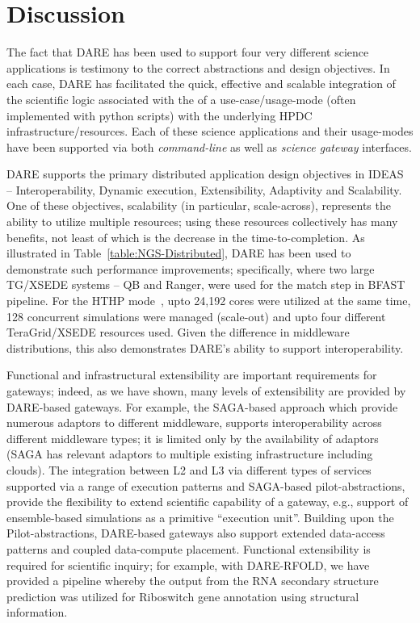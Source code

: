 \documentclass[]{svjour3}
\begin{document}
\section{Discussion}

The fact that DARE has been used to support four very different
science applications is testimony to the correct abstractions and
design objectives. In each case, DARE has facilitated the quick,
effective and scalable integration of the scientific logic associated
with the of a use-case/usage-mode (often implemented with python
scripts) with the underlying HPDC infrastructure/resources. Each of
these science applications and their usage-modes have been supported
via both {\it command-line} as well as {\it science gateway}
interfaces.

DARE supports the primary distributed application design objectives in
IDEAS~\cite{ideas} -- Interoperability, Dynamic execution,
Extensibility, Adaptivity and Scalability. One of these objectives,
scalability (in particular, scale-across), represents the ability to
utilize multiple resources; using these resources collectively has
many benefits, not least of which is the decrease in the
time-to-completion. As illustrated in
Table~\ref{table:NGS-Distributed}, DARE has been used to demonstrate
such performance improvements; specifically, where two large TG/XSEDE
systems -- QB and Ranger, were used for the match step in BFAST
pipeline. For the HTHP mode~\cite{bigjob-ccgrid12}, upto 24,192 cores
were utilized at the same time, 128 concurrent simulations were
managed (scale-out) and upto four different TeraGrid/XSEDE resources
used. Given the difference in middleware distributions, this also
demonstrates DARE's ability to support interoperability.

Functional and infrastructural extensibility are important
requirements for gateways; indeed, as we have shown, many levels of
extensibility are provided by DARE-based gateways. For example, the
SAGA-based approach which provide numerous adaptors to different
middleware, supports interoperability across different middleware
types; it is limited only by the availability of adaptors (SAGA has
relevant adaptors to multiple existing infrastructure including
clouds). The integration between L2 and L3 via different types of
services supported via a range of execution patterns and SAGA-based
pilot-abstractions, provide the flexibility to extend scientific
capability of a gateway, e.g., support of ensemble-based simulations
as a primitive ``execution unit''. Building upon the
Pilot-abstractions, DARE-based gateways also support extended
data-access patterns and coupled data-compute placement. Functional
extensibility is required for scientific inquiry; for example, with
DARE-RFOLD, we have provided a pipeline whereby the output from the
RNA secondary structure prediction was utilized for Riboswitch gene
annotation using structural information.
\end{document}
